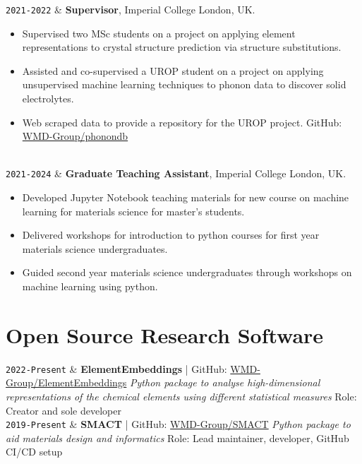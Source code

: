 \documentclass[11pt,a4paper]{article}
\newcommand{\ICL}{Imperial College London}
\newcommand{\Duration}[2]{\fontsize{10pt}{0}\selectfont \texttt{#1-#2}}
\newcommand{\Ongoing}{Present}
\newcommand{\GitHub}[1]{\faGithub{} GitHub: \href{https://github.com/#1}{#1}}
\begin{document}
\begin{EntriesTableDuration}
  \Duration{2021}{2022} & \textbf{Supervisor}, \ICL{}, UK.
  \begin{itemize}
    \item Supervised two MSc students on a project on applying element representations to crystal structure prediction via structure substitutions.
    \item Assisted and co-supervised a UROP student on a project on applying unsupervised machine learning techniques to phonon data to discover solid electrolytes. 
    \item Web scraped data to provide a repository for the UROP project. \GitHub{WMD-Group/phonondb} 
    \vspace{-\baselineskip}
  \end{itemize}
  \\
  \Duration{2021}{2024} & \textbf{Graduate Teaching Assistant}, \ICL{}, UK.
  \begin{itemize}
    \item Developed Jupyter Notebook teaching materials for new course on machine learning for materials science for master's students.
    \item Delivered workshops for introduction to python courses for first year materials science undergraduates.
    \item Guided second year materials science undergraduates through workshops on machine learning using python.
    \vspace{-\baselineskip}
  \end{itemize}
\end{EntriesTableDuration}

\section{Open Source Research Software}

\begin{EntriesTableDuration}
  \Duration{2022}{\Ongoing} &
  \textbf{ElementEmbeddings} | \GitHub{WMD-Group/ElementEmbeddings}
  \newline
  \textit{Python package to analyse high-dimensional representations of the chemical elements using different statistical measures}
  \newline
  Role: Creator and sole developer
  \\
  \Duration{2019}{\Ongoing} &
  \textbf{SMACT} | \GitHub{WMD-Group/SMACT}
  \newline
  \textit{Python package to aid materials design and informatics}
  \newline
  Role: Lead maintainer, developer, GitHub CI/CD setup
\end{EntriesTableDuration}
\end{document}
